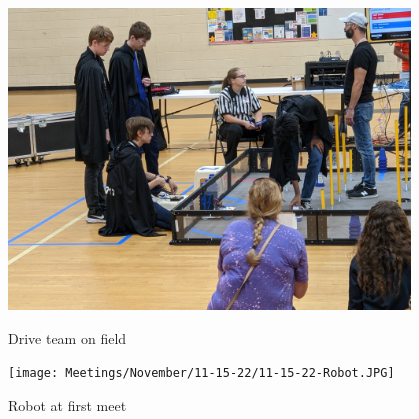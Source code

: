 \begin{figure}[ht]
\centering
\begin{minipage}[b]{.48\textwidth}
  \centering
  \includegraphics[width=0.95\textwidth]{Meetings/November/11-15-22/11-15-22-Field.jpg}
  \caption{Drive team on field}
  \label{fig:pic1}
\end{minipage}%
\hfill%
\begin{minipage}[b]{.48\textwidth}
  \centering
  \texttt{[image: Meetings/November/11-15-22/11-15-22-Robot.JPG]}
  \caption{Robot at first meet}
  \label{fig:pic2}
\end{minipage}
\end{figure}

